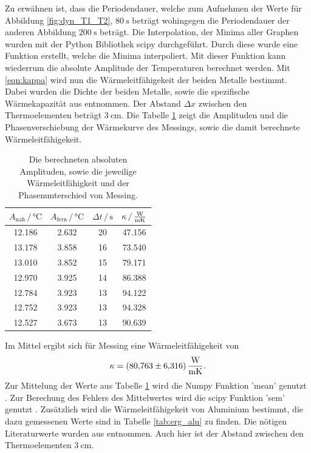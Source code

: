 
Zu erwähnen ist, dass die Periodendauer, welche zum Aufnehmen der Werte für Abbildung \ref{fig:dyn_T1_T2}, $\SI{80}{\second}$ beträgt wohingegen die Periodendauer der anderen Abbildung $\SI{200}{\second}$ beträgt.
Die Interpolation, der Minima aller Graphen wurden mit der Python Bibliothek scipy \cite{scipy} durchgeführt.
Durch diese wurde eine Funktion erstellt, welche die Minima interpoliert.
Mit dieser Funktion kann wiederrum die absolute Amplitude der Temperaturen berechnet werden.
Mit \eqref{eqn:kappa} wird nun die Wärmeleitfähigekeit der beiden Metalle bestimmt.
Dabei wurden die Dichte der beiden Metalle, sowie die spezifische Wärmekapazität aus \cite{anleitung} entnommen.
Der Abstand $\Delta x$ zwischen den Thermoelementen beträgt $\SI{3}{\centi\meter}$.
Die Tabelle \ref{tab:erg_mess} zeigt die Amplituden und die Phasenverschiebung der Wärmekurve des Messings, sowie die damit berechnete Wärmeleitfähigekeit.
\begin{table}
\centering
\caption{Die berechneten absoluten Amplituden, sowie die jeweilige Wärmeleitfähigkeit und der Phasenunterschied von Messing.}
\begin{tabular}{cccc}    
    \toprule
    $A_\text{nah} \,/\, \si{\celsius}$ & $A_\text{fern} \,/\, \si{\celsius}$ & $\Delta t \,/\, \si{\second}$ & $\kappa \, / \, \si{\frac{\watt}{\meter\kelvin}}$ \\
    \midrule
    12.186 & 2.632 & 20 & 47.156 \\
    13.178 & 3.858 & 16 & 73.540 \\
    13.010 & 3.852 & 15 & 79.171 \\
    12.970 & 3.925 & 14 & 86.388 \\
    12.784 & 3.923 & 13 & 94.122 \\
    12.752 & 3.923 & 13 & 94.328 \\
    12.527 & 3.673 & 13 & 90.639 \\
    \bottomrule
\end{tabular}
\label{tab:erg_mess}
\end{table}
\FloatBarrier
Im Mittel ergibt sich für Messing eine Wärmeleitfähigekeit von 
\begin{equation*}
    \kappa = \SI{80.763(6316)}{\frac{\watt}{\meter\kelvin}} .
\end{equation*}
Zur Mittelung der Werte aus Tabelle \ref{tab:erg_mess} wird die Numpy Funktion 'mean' genutzt \cite{numpy}.
Zur Berechung des Fehlers des Mittelwertes wird die scipy Funktion 'sem' genutzt \cite{scipy}.
Zusätzlich wird die Wärmeleitfähigekeit von Aluminium bestimmt, die dazu gemessenen Werte sind in Tabelle \ref{tab:erg_alu} zu finden.
Die nötigen Literaturwerte wurden aus \cite{anleitung} entnommen. Auch hier ist der Abstand zwischen den Thermoelementen $\SI{3}{\centi\meter}$.

